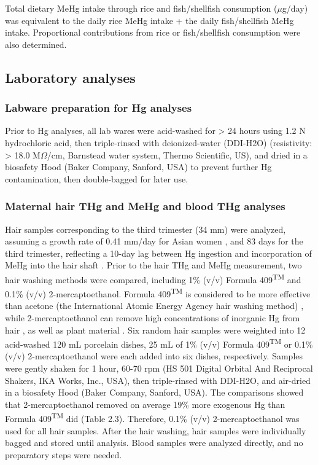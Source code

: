 Total dietary MeHg intake through rice and fish/shellfish consumption (\({\mu}\)g/day) was equivalent to the daily rice MeHg intake + the daily fish/shellfish MeHg intake. Proportional contributions from rice or fish/shellfish consumption were also determined. 

\subsection{Laboratory analyses}

\subsubsection{Labware preparation for Hg analyses}

Prior to Hg analyses, all lab wares were acid-washed for > 24 hours using 1.2 N hydrochloric acid, then triple-rinsed with deionized-water (DDI-H2O) (resistivity: > 18.0 M\({\Omega}\)/cm, Barnstead water system, Thermo Scientific, US), and dried in a biosafety Hood (Baker Company, Sanford, USA) to prevent further Hg contamination, then double-bagged for later use. 

\subsubsection{Maternal hair THg and MeHg and blood THg analyses}

Hair samples corresponding to the third trimester (34 mm) were analyzed, assuming a growth rate of 0.41 mm/day for Asian women \citep{loussouarn2005diversity}, and 83 days for the third trimester, reflecting a 10-day lag between Hg ingestion and incorporation of MeHg into the hair shaft \citep{cernichiari1994biological}. Prior to the hair THg and MeHg measurement, two hair washing methods were compared, including 1\% (v/v) Formula 409\textsuperscript{TM} and 0.1\% (v/v) 2-mercaptoethanol. Formula 409\textsuperscript{TM} is considered to be more effective than acetone (the International Atomic Energy Agency hair washing method) \citep{rothenberg2013prenatal}, while 2-mercaptoethanol can remove high concentrations of inorganic Hg from hair \citep{li2011human}, as well as plant material \citep{north2000heterogeneity}. Six random hair samples were weighted into 12 acid-washed 120 mL porcelain dishes, 25 mL of 1\% (v/v) Formula 409\textsuperscript{TM} or 0.1\% (v/v) 2-mercaptoethanol were each added into six dishes, respectively. Samples were gently shaken for 1 hour, 60-70 rpm (HS 501 Digital Orbital And Reciprocal Shakers, IKA Works, Inc., USA), then triple-rinsed with DDI-H2O, and air-dried in a biosafety Hood (Baker Company, Sanford, USA). The comparisons showed that 2-mercaptoethanol removed on average 19\% more exogenous Hg than Formula 409\textsuperscript{TM} did (Table 2.3). Therefore, 0.1\% (v/v) 2-mercaptoethanol was used for all hair samples. After the hair washing, hair samples were individually bagged and stored until analysis. Blood samples were analyzed directly, and no preparatory steps were needed.


